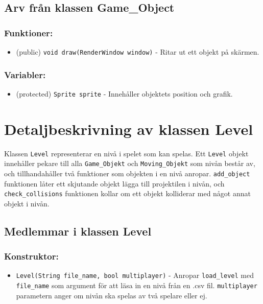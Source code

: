 \documentclass{TDP005mall}
\begin{document}
\subsection{Arv från klassen Game\_Object}
\subsubsection{Funktioner:}
\begin{itemize}
  \item (public) \verb|void draw(RenderWindow window)| - Ritar ut ett objekt på skärmen.
\end{itemize}

\subsubsection{Variabler:}
\begin{itemize}
  \item (protected) \verb|Sprite sprite| - Innehåller objektets position och grafik. 
\end{itemize}

\section{Detaljbeskrivning av klassen Level}
Klassen \verb|Level| representerar en nivå i spelet som kan spelas. Ett \verb|Level| objekt innehåller pekare till alla \verb|Game_Objekt| och \verb|Moving_Objekt| som nivån består av, och tillhandahåller två funktioner som objekten i en nivå anropar. \verb|add_object| funktionen låter ett skjutande objekt lägga till projektilen i nivån, och \verb|check_collisions| funktionen kollar om ett objekt kolliderar med något annat objekt i nivån.

\subsection{Medlemmar i klassen Level}
\subsubsection{Konstruktor:}
\begin{itemize}
  \item  \verb|Level(String file_name, bool multiplayer)| - Anropar \verb|load_level| med \verb|file_name| som argument för att läsa in en nivå från en .csv fil. \verb|multiplayer| parametern anger om nivån ska spelas av två spelare eller ej.
  
\end{itemize}
\end{document}
